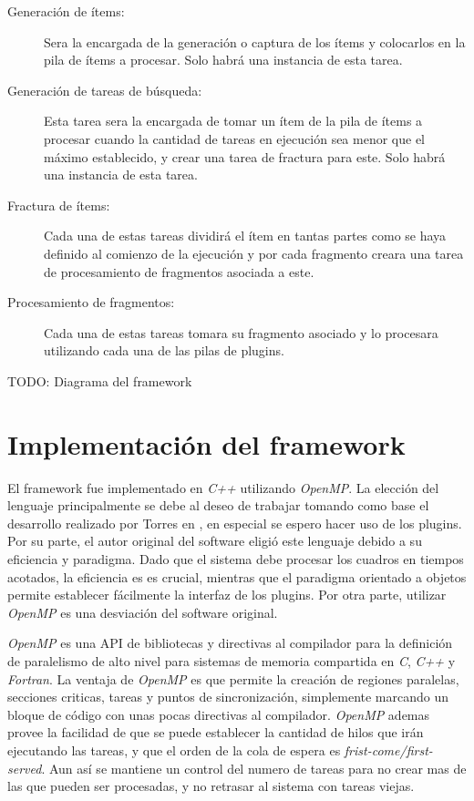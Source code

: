 \begin{description}

\item[Generación de ítems:] Sera la encargada de la generación o captura de los
	ítems y colocarlos en la pila de ítems a procesar. Solo habrá una
	instancia de esta tarea.

\item[Generación de tareas de búsqueda:] Esta tarea sera la encargada de tomar
	un ítem de la pila de ítems a procesar cuando la cantidad de tareas en
	ejecución sea menor que el máximo establecido, y crear una tarea de
	fractura para este. Solo habrá una instancia de esta tarea.

\item[Fractura de ítems:] Cada una de estas tareas dividirá el ítem en tantas
	partes como se haya definido al comienzo de la ejecución y por cada
	fragmento creara una tarea de procesamiento de fragmentos asociada a
	este.

\item[Procesamiento de fragmentos:] Cada una de estas tareas tomara su fragmento
	asociado y lo procesara utilizando cada una de las pilas de plugins.

\end{description}

TODO: Diagrama del framework

\section{Implementación del framework}

El framework fue implementado en \emph{C++} utilizando \emph{OpenMP}. La
elección del lenguaje principalmente se debe al deseo de trabajar tomando como
base el desarrollo realizado por Torres en \cite{torres2014}, en especial se
espero hacer uso de los plugins. Por su parte, el autor original del software
eligió este lenguaje debido a su eficiencia y paradigma. Dado que el sistema
debe procesar los cuadros en tiempos acotados, la eficiencia es es crucial,
mientras que el paradigma orientado a objetos permite establecer fácilmente la
interfaz de los plugins. Por otra parte, utilizar \emph{OpenMP} es una
desviación del software original.

\emph{OpenMP} es una API de bibliotecas y directivas al compilador para la
definición de paralelismo de alto nivel para sistemas de memoria compartida en
\emph{C}, \emph{C++} y \emph{Fortran}\cite{ompWeb}. La ventaja de \emph{OpenMP}
es que permite la creación de regiones paralelas, secciones criticas, tareas y
puntos de sincronización, simplemente marcando un bloque de código con unas
pocas directivas al compilador. \emph{OpenMP} ademas provee la facilidad de que
se puede establecer la cantidad de hilos que irán ejecutando las tareas, y que
el orden de la cola de espera es \emph{frist-come/first-served}. Aun así se
mantiene un control del numero de tareas para no crear mas de las que pueden ser
procesadas, y no retrasar al sistema con tareas viejas.

